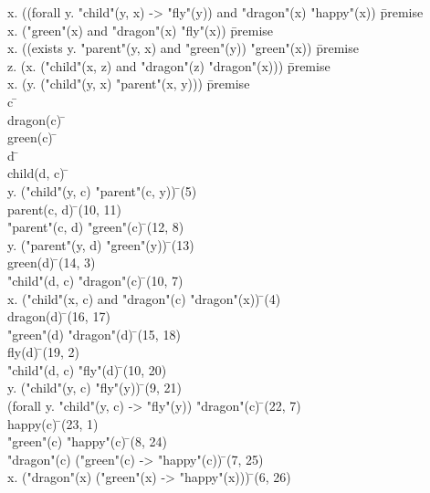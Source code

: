 \documentclass{article}
\begin{document}
\begin{proofbox}
\: \forall x. ((forall y. "child"(y, x) -> "fly"(y)) and "dragon"(x) \rightarrow "happy"(x)) \= \hbox{premise} \\
\: \forall x. ("green"(x) and "dragon"(x) \rightarrow "fly"(x)) \= \hbox{premise} \\
\: \forall x. ((exists y. "parent"(y, x) and "green"(y)) \rightarrow "green"(x)) \= \hbox{premise} \\
\: \forall z. (\forall x. ("child"(x, z) and "dragon"(z) \rightarrow "dragon"(x))) \= \hbox{premise} \\
\: \forall x. (\forall y. ("child"(y, x) \rightarrow "parent"(x, y))) \= \hbox{premise} \\
\open
\: c \= \forallintroconst \\
\open
\: dragon(c) \= \asm \\
\open
\: green(c) \= \asm \\
\open
\: d \= \forallintroconst \\
\open
\: child(d, c) \= \asm \\
\: \forall y. ("child"(y, c) \rightarrow "parent"(c, y)) \= \forallelim(5) \\
\: parent(c, d) \= \forallelim(10, 11) \\
\: "parent"(c, d) \land "green"(c) \= \andintro(12, 8) \\
\: \exists y. ("parent"(y, d) \land "green"(y)) \= \existsintro(13) \\
\: green(d) \= \forallelim(14, 3) \\
\: "child"(d, c) \land "dragon"(c) \= \andintro(10, 7) \\
\: \forall x. ("child"(x, c) and "dragon"(c) \rightarrow "dragon"(x)) \= \forallelim(4) \\
\: dragon(d) \= \forallelim(16, 17) \\
\: "green"(d) \land "dragon"(d) \= \andintro(15, 18) \\
\: fly(d) \= \forallelim(19, 2) \\
\close
\: "child"(d, c) \rightarrow "fly"(d) \= \impliesintro(10, 20) \\
\close
\: \forall y. ("child"(y, c) \rightarrow "fly"(y)) \= \forallintro(9, 21) \\
\: (forall y. "child"(y, c) -> "fly"(y)) \land "dragon"(c) \= \andintro(22, 7) \\
\: happy(c) \= \forallelim(23, 1) \\
\close
\: "green"(c) \rightarrow "happy"(c) \= \impliesintro(8, 24) \\
\close
\: "dragon"(c) \rightarrow ("green"(c) -> "happy"(c)) \= \impliesintro(7, 25) \\
\close
\: \forall x. ("dragon"(x) \rightarrow ("green"(x) -> "happy"(x))) \= \forallintro(6, 26) \\
\end{proofbox}
\end{document}

